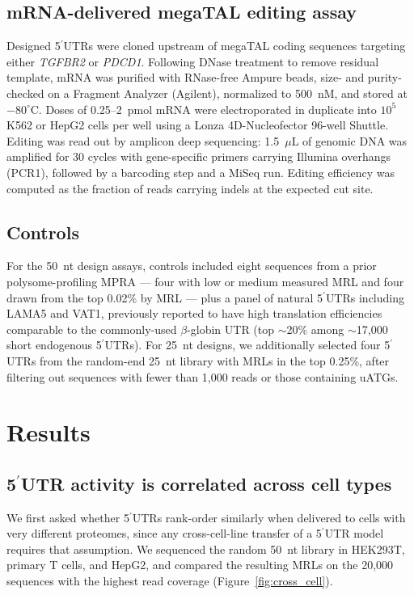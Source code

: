 \documentclass[11pt]{article}
\begin{document}
\subsection{mRNA-delivered megaTAL editing assay}

Designed 5$^\prime$UTRs were cloned upstream of megaTAL coding sequences
targeting either \emph{TGFBR2} or \emph{PDCD1}. Following DNase treatment
to remove residual template, mRNA was purified with RNase-free Ampure
beads, size- and purity-checked on a Fragment Analyzer (Agilent),
normalized to 500~nM, and stored at $-80^\circ$C. Doses of 0.25--2~pmol
mRNA were electroporated in duplicate into $10^{5}$ K562 or HepG2 cells
per well using a Lonza 4D-Nucleofector 96-well Shuttle. Editing was
read out by amplicon deep sequencing: 1.5~$\mu$L of genomic DNA was
amplified for 30 cycles with gene-specific primers carrying Illumina
overhangs (PCR1), followed by a barcoding step and a MiSeq run.
Editing efficiency was computed as the fraction of reads carrying
indels at the expected cut site.

\subsection{Controls}

For the 50~nt design assays, controls included eight sequences from a
prior polysome-profiling MPRA --- four with low or medium measured MRL
and four drawn from the top 0.02\% by MRL --- plus a panel of natural
5$^\prime$UTRs including LAMA5 and VAT1, previously reported to have
high translation efficiencies comparable to the commonly-used
$\beta$-globin UTR (top $\sim$20\% among $\sim$17{,}000 short endogenous
5$^\prime$UTRs). For 25~nt designs, we additionally selected four
5$^\prime$UTRs from the random-end 25~nt library with MRLs in the top
0.25\%, after filtering out sequences with fewer than 1{,}000 reads or
those containing uATGs.

\section{Results}

\subsection{5$^\prime$UTR activity is correlated across cell types}

We first asked whether 5$^\prime$UTRs rank-order similarly when delivered to
cells with very different proteomes, since any cross-cell-line transfer of a
5$^\prime$UTR model requires that assumption. We sequenced the random 50~nt
library in HEK293T, primary T cells, and HepG2, and compared the resulting
MRLs on the 20{,}000 sequences with the highest read coverage
(Figure~\ref{fig:cross_cell}).
\end{document}
